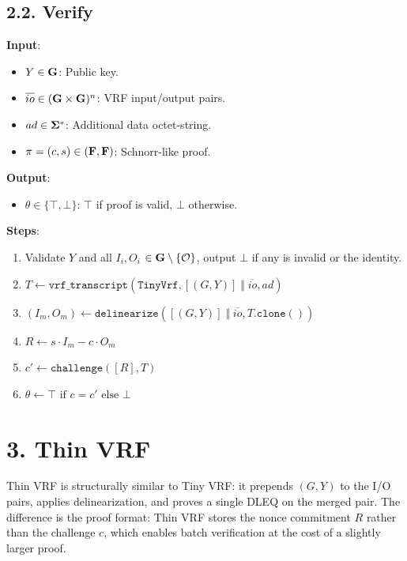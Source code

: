\documentclass[
]{article}
\providecommand{\tightlist}{%
  \setlength{\itemsep}{0pt}\setlength{\parskip}{0pt}}
\begin{document}
\subsection{2.2. Verify}\label{verify}

\textbf{Input}:

\begin{itemize}
\tightlist
\item
  \(Y \in \bold{G}\): Public key.
\item
  \(\overline{io} \in (\bold{G}\times \bold{G})^n\): VRF input/output
  pairs.
\item
  \(ad \in \bold{\Sigma}^*\): Additional data octet-string.
\item
  \(\pi = (c, s) \in (\bold{F}, \bold{F})\): Schnorr-like proof.
\end{itemize}

\textbf{Output}:

\begin{itemize}
\tightlist
\item
  \(\theta \in \{ \top, \bot \}\): \(\top\) if proof is valid, \(\bot\)
  otherwise.
\end{itemize}

\textbf{Steps}:

\begin{enumerate}
\def\labelenumi{\arabic{enumi}.}
\tightlist
\item
  Validate \(Y\) and all \(I_i, O_i\)
  \(\in \bold{G}\setminus \{\mathcal{O}\}\), output \(\bot\) if any is
  invalid or the identity.
\item
  \(T \gets \texttt{vrf\_transcript}(\texttt{TinyVrf}, [(G, Y)] \;\Vert\; \overline{io}, ad)\)
\item
  \((I_m, O_m) \gets \texttt{delinearize}([(G, Y)] \;\Vert\; \overline{io}, T.\texttt{clone}())\)
\item
  \(R \gets s \cdot I_m - c \cdot O_m\)
\item
  \(c' \gets \texttt{challenge}([R], T)\)
\item
  \(\theta \gets \top \text{ if } c = c' \text{ else } \bot\)
\end{enumerate}

\section{3. Thin VRF}\label{thin-vrf}

Thin VRF is structurally similar to Tiny VRF: it prepends \((G, Y)\) to
the I/O pairs, applies delinearization, and proves a single DLEQ on the
merged pair. The difference is the proof format: Thin VRF stores the
nonce commitment \(R\) rather than the challenge \(c\), which enables
batch verification at the cost of a slightly larger proof.
\end{document}
